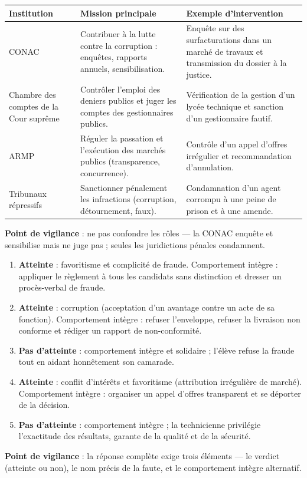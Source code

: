 \documentclass[11pt]{article}
\begin{document}
\begin{corrige}
\begin{center}
\begin{tabularx}{\linewidth}{|l|X|X|}\hline
\rowcolor{popblueL} \textbf{Institution} & \textbf{Mission principale} & \textbf{Exemple d'intervention} \\ \hline
CONAC & Contribuer à la lutte contre la corruption : enquêtes, rapports annuels, sensibilisation. & Enquête sur des surfacturations dans un marché de travaux et transmission du dossier à la justice. \\ \hline
Chambre des comptes de la Cour suprême & Contrôler l'emploi des deniers publics et juger les comptes des gestionnaires publics. & Vérification de la gestion d'un lycée technique et sanction d'un gestionnaire fautif. \\ \hline
ARMP & Réguler la passation et l'exécution des marchés publics (transparence, concurrence). & Contrôle d'un appel d'offres irrégulier et recommandation d'annulation. \\ \hline
Tribunaux répressifs & Sanctionner pénalement les infractions (corruption, détournement, faux). & Condamnation d'un agent corrompu à une peine de prison et à une amende. \\ \hline
\end{tabularx}
\end{center}
\textbf{Point de vigilance} : ne pas confondre les rôles — la CONAC enquête et sensibilise mais ne juge pas ; seules les juridictions pénales condamnent.
\end{corrige}

\begin{corrige}
\begin{enumerate}
\item \textbf{Atteinte} : favoritisme et complicité de fraude. Comportement intègre : appliquer le règlement à tous les candidats sans distinction et dresser un procès-verbal de fraude.
\item \textbf{Atteinte} : corruption (acceptation d'un avantage contre un acte de sa fonction). Comportement intègre : refuser l'enveloppe, refuser la livraison non conforme et rédiger un rapport de non-conformité.
\item \textbf{Pas d'atteinte} : comportement intègre et solidaire ; l'élève refuse la fraude tout en aidant honnêtement son camarade.
\item \textbf{Atteinte} : conflit d'intérêts et favoritisme (attribution irrégulière de marché). Comportement intègre : organiser un appel d'offres transparent et se déporter de la décision.
\item \textbf{Pas d'atteinte} : comportement intègre ; la technicienne privilégie l'exactitude des résultats, garante de la qualité et de la sécurité.
\end{enumerate}
\textbf{Point de vigilance} : la réponse complète exige trois éléments — le verdict (atteinte ou non), le nom précis de la faute, et le comportement intègre alternatif.
\end{corrige}
\end{document}
